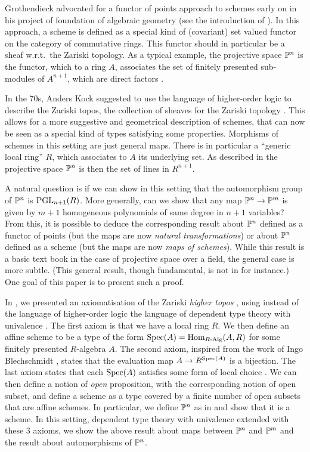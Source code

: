 Grothendieck advocated for a functor of points approach to schemes early on in his
project of foundation of algebraic geometry (see the introduction of \cite{EGAI}).
In this approach, a scheme is defined as a special kind of (covariant) set valued functor
on the category of commutative rings. This functor should in particular
be a sheaf w.r.t.\ the Zariski topology. As a typical example, the projective space $\mathbb{P}^n$
is the functor, which to a ring $A$,
associates the set of finitely presented sub-modules of $A^{n+1}$, which are direct factors \cite{Demazure,Eisenbud,Jantzen}.

In the 70s, Anders Kock suggested to use the language of higher-order logic \cite{Church40}
to describe the Zariski topos, the collection of sheaves for the Zariski topology \cite{Kock74,kockreyes}.
This allows for
a more suggestive and geometrical description of schemes, that can now be seen as a special kind
of types satisfying some properties. Morphisms of schemes in this setting are just general maps.
There is in particular a ``generic
local ring'' $R$, which associates to $A$ its underlying set. As described in \cite{kockreyes}
the projective space $\mathbb{P}^n$ is then the set of lines in $R^{n+1}$.

A natural question is if we can show in this setting that the automorphism group of $\mathbb{P}^n$
is  $\operatorname{PGL}_{n+1}(R)$.
More generally, can we show that any map $\mathbb{P}^n\rightarrow \mathbb{P}^m$ is given by $m+1$ homogeneous
polynomials of same degree in $n+1$ variables?
From this, it is possible to deduce the corresponding result about $\mathbb{P}^n$ defined as
a functor of points (but the maps are now {\em natural transformations}) or about $\mathbb{P}^n$ defined
as a scheme (but the maps are now {\em maps of schemes}).
While this result is a basic text book in the case of projective space over a field, the general
case is more subtle.
(This general result, though fundamental, is not in \cite{Hartshorne} for instance.)
One goal of this paper is to present such a proof.

In \cite{draft}, we presented an axiomatisation of the Zariski {\em higher topos} \cite{lurie-htt},
using instead of the language of higher-order logic the language of dependent type theory
with univalence \cite{hott}. The first axiom is that we have a local ring $R$. We then define
an affine scheme to be a type of the form $\operatorname{Spec}(A) = \mathrm{Hom}_{R\text{-}\mathrm{Alg}}(A,R)$ for some finitely presented
$R$-algebra $A$. The second axiom, inspired from the work of Ingo Blechschmidt \cite{ingo-thesis},
states that the evaluation map $A\rightarrow R^{\operatorname{Spec}(A)}$ is a bijection. The last axiom states
that each $\operatorname{Spec}(A)$ satisfies some form of local choice \cite{draft}. We can then define a notion
of {\em open} proposition, with the corresponding notion of open subset, and define a scheme as a type
covered by a finite number of open subsets that are affine schemes. In particular, we define
$\mathbb{P}^n$ as in \cite{kockreyes} and show that it is a scheme.
In this setting, dependent type theory with univalence extended with these 3 axioms,
we show the above result about maps between $\mathbb{P}^n$ and $\mathbb{P}^m$ and the result about automorphisms of $\mathbb{P}^n$.

